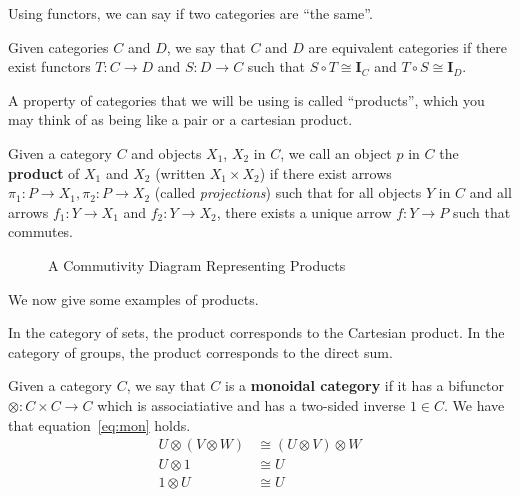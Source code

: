 \documentclass[14pt]{extarticle}  %
\begin{document}
Using functors, we can say if two categories are ``the same''.


\begin{defn}
  Given categories $C$ and $D$, we say that $C$ and $D$ are equivalent categories if there exist functors $T : C \to D$ and $S : D \to C$ such that $S \circ T \cong \textbf{I}_{C}$ and $T \circ S \cong \textbf{I}_{D}$.
\end{defn}


A property of categories that we will be using is called ``products'', which you may think of as being like a pair or a cartesian product.

\begin{defn}
  Given a category $C$ and objects $X_{1}$, $X_{2}$ in $C$, we call an object $p$ in $C$ the \textbf{product} of $X_{1}$ and $X_{2}$ (written $X_{1} \times X_{2}$) if there exist arrows
  $\pi_{1} : P \to X_{1}, \pi_{2} : P \to X_{2}$ (called \textit{projections}) such that for all objects $Y$ in $C$ and all arrows $f_{1} : Y \to X_{1}$ and $f_{2} : Y \to X_{2}$, there exists a unique arrow
  $f : Y \to P$ such that  commutes.


  \begin{figure}
\centering
\caption{A Commutivity Diagram Representing Products}
\label{fig:prods}
\end{figure}

We now give some examples of products.
\begin{ex}
  In the category of sets, the product corresponds to the Cartesian product. In the category of groups, the product corresponds to the direct sum.
\end{ex}

\begin{defn}
  Given a category $C$, we say that $C$ is a \textbf{monoidal category} if it has a bifunctor $\otimes : C \times C \to C$ which is associatiative and has a two-sided inverse $1 \in C$. We have that equation~\ref{eq:mon} holds.
  \begin{align}\label{eq:mon}
    U \otimes (V \otimes W) &\cong (U \otimes V) \otimes W \\
    U \otimes 1 &\cong U \\
    1 \otimes U &\cong U
    \end{align}
\end{defn}


\end{defn}
\end{document}
